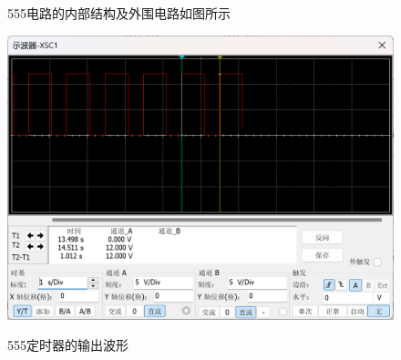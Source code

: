 \documentclass[12p,UTF8]{article}
\begin{document}
\begin{spacing}{1.25}
  \begin{figure}[H]
    \centering  %
    \caption{555电路的内部结构及外围电路如图所示}
    \label{555}
  \end{figure}
  \begin{figure}[H]
    \centering  %
    \label{4511BP}
    \includegraphics[width=1\textwidth]{sbq.png}
    \caption{555定时器的输出波形}
    \label{4511BP}
  \end{figure}
    

\end{spacing}
\end{document}
